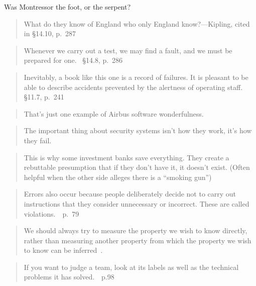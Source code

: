 \documentclass[a4paper]{article}
\begin{document}
Was Montressor the foot, or the serpent?

\medskip
\begin{quote}
	What do they know of England who only England
	know?---Kipling, cited in \cite{Kletz1999} \S 14.10, p.\ 287
\end{quote}
	
\medskip
\begin{quote}
	Whenever we carry out a test, we may find a fault, and we
	must be prepared for one.~\cite{Kletz1999} \S 14.8, p.\ 286
\end{quote}

\medskip
\begin{quote}
	Inevitably, a book like this one is a record of failures.  It
	is pleasant to be able to describe accidents prevented by the
	alertness of operating staff.~\cite{Kletz1999} \S 11.7, p.\ 241
\end{quote}

\medskip
\begin{quote}
	That's just one example of Airbus software
	wonderfulness.~\cite{Anon2007}
\end{quote}

\medskip
\begin{quote}
	The important thing about security systems isn't how they work,
	it's how they fail.~\cite{Doctorow2008}
\end{quote}

\medskip
\begin{quote}
	This is why some investment banks save everything. They create
	a rebuttable presumption that if they don't have it, it doesn't
	exist. (Often helpful when the other side alleges there is a
	``smoking gun'')~\cite{Vengie2008}
\end{quote}

\medskip
\begin{quote}
	Errors also occur because people deliberately decide not to carry
	out instructions that they consider unnecessary or incorrect.
	These are called violations.~\cite{Kletz1999}~p.~79
\end{quote}

\medskip
\begin{quote}
	We should always try to measure the property we wish to know
	directly, rather than measuring another property from which
	the property we wish to know can be inferred~\citet[p.~89]{Kletz1999}.
\end{quote}

\medskip
\begin{quote}
	If you want to judge a team, look at its labels as well as the
	technical problems it has solved.~\cite{Kletz1999}~p.98
\end{quote}
\end{document}
